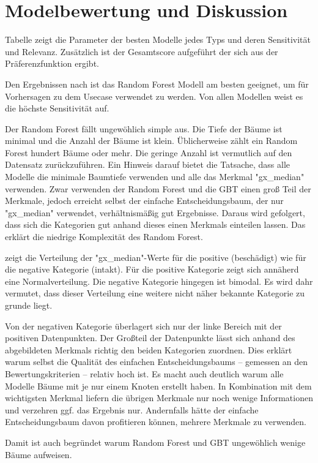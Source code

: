 \chapter{Modelbewertung und Diskussion}
\label{ch:modelbewertung}
Tabelle  zeigt die Parameter der besten Modelle jedes Typs und deren Sensitivität und Relevanz. Zusätzlich ist der Gesamtscore aufgeführt der sich aus der Präferenzfunktion ergibt.



Den Ergebnissen nach ist das Random Forest Modell am besten geeignet, um für Vorhersagen zu dem Usecase verwendet zu werden. Von allen Modellen weist es die höchste Sensitivität auf. 

Der Random Forest fällt ungewöhlich simple aus. Die Tiefe der Bäume ist minimal und die Anzahl der Bäume ist klein. Üblicherweise zählt ein Random Forest hundert Bäume oder mehr. Die geringe Anzahl ist vermutlich auf den Datensatz zurückzuführen. Ein Hinweis darauf bietet die Tatsache, dass alle Modelle die minimale Baumtiefe verwenden und alle das Merkmal "gx\_median" verwenden. Zwar verwenden der Random Forest und die GBT einen groß Teil der Merkmale, jedoch erreicht selbst der einfache Entscheidungsbaum, der nur "gx\_median" verwendet, verhältnismäßig gut Ergebnisse. Daraus wird gefolgert, dass sich die Kategorien gut anhand dieses einen Merkmals einteilen lassen. Das erklärt die niedrige Komplexität des Random Forest.

 zeigt die Verteilung der "gx\_median"-Werte für die positive (beschädigt) wie für die negative Kategorie (intakt). Für die positive Kategorie zeigt sich annäherd eine Normalverteilung. Die negative Kategorie hingegen ist bimodal. Es wird dahr vermutet, dass dieser Verteilung eine weitere nicht näher bekannte Kategorie zu grunde liegt.

Von der negativen Kategorie überlagert sich nur der linke Bereich mit der positiven Datenpunkten. Der Großteil der Datenpunkte lässt sich anhand des abgebildeten Merkmals richtig den beiden Kategorien zuordnen. Dies erklärt warum selbst die Qualität des einfachen Entscheidungsbaums -- gemessen an den Bewertungskriterien -- relativ hoch ist. Es macht auch deutlich warum alle Modelle Bäume mit je nur einem Knoten erstellt haben. In Kombination mit dem wichtigsten Merkmal liefern die übrigen Merkmale nur noch wenige Informationen und verzehren ggf. das Ergebnis nur. Andernfalls hätte der einfache Entscheidungsbaum davon profitieren können, mehrere Merkmale zu verwenden.

Damit ist auch begründet warum Random Forest und GBT ungewöhlich wenige Bäume aufweisen.
